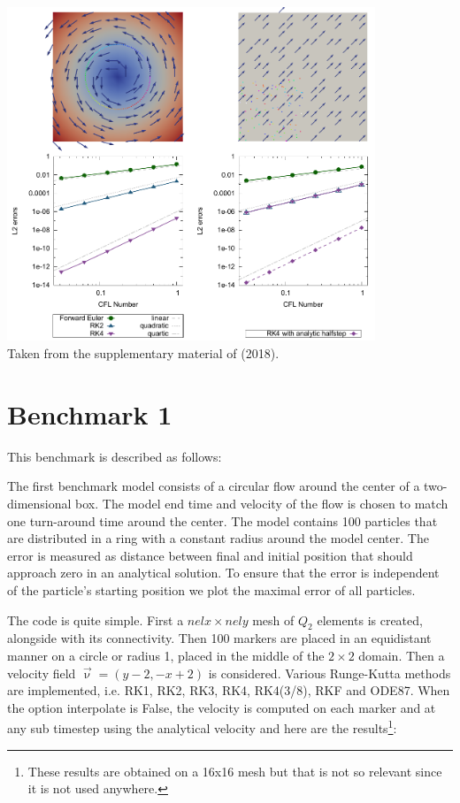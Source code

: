 \begin{center}
\includegraphics[width=11cm]{python_codes/fieldstone_122/images/galh18.png}\\
{\captionfont Taken from the supplementary material of \textcite{galh18} (2018).}
\end{center}

\section*{Benchmark 1}

This benchmark is described as follows:
\begin{displayquote}
The first benchmark model consists of a circular flow
around the center of a two-dimensional box. The model
end time and velocity of the flow is chosen to match one
turn-around time around the center. The model contains
100 particles that are distributed in a ring with a constant
radius around the model center. The error is measured as
distance between final and initial position that should approach 
zero in an analytical solution. To ensure that the
error is independent of the particle’s starting position we
plot the maximal error of all particles.
\end{displayquote}

The code is quite simple. First a $nelx \times nely$ mesh of $Q_2$ elements
is created, alongside with its connectivity.
Then 100 markers are placed in an equidistant manner on a circle or radius 1, placed in
the middle of the $2\times 2$ domain. Then a velocity field $\vec\upnu=(y-2,-x+2)$ is considered. 
Various Runge-Kutta methods are implemented, i.e. RK1, RK2, RK3, RK4, RK4(3/8), RKF and ODE87.
When the option {\python interpolate} is False, the velocity is computed on each marker and at 
any sub timestep using the analytical velocity and here are the results\footnote{These results are 
obtained on a 16x16 mesh but that is not so relevant since it is not used anywhere.}:

